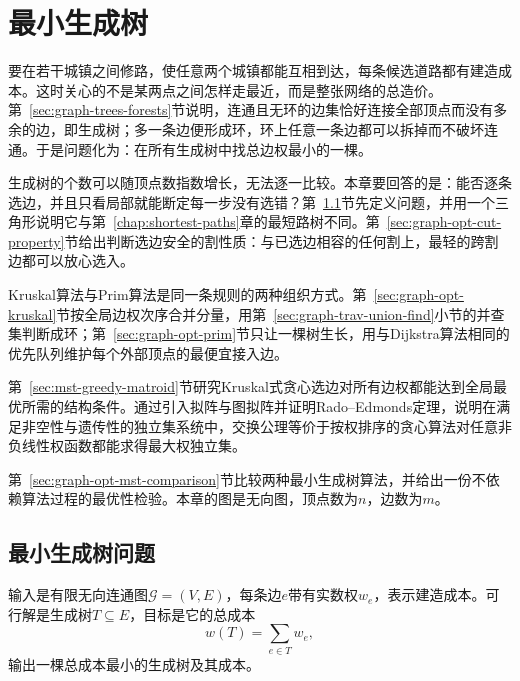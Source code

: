 
\chapter{最小生成树}
\label{sec:graph-minimum-spanning-tree}
\label{chap:minimum-spanning-tree}

要在若干城镇之间修路，使任意两个城镇都能互相到达，每条候选道路都有建造成本。这时关心的不是某两点之间怎样走最近，而是整张网络的总造价。第~\ref{sec:graph-trees-forests}节说明，连通且无环的边集恰好连接全部顶点而没有多余的边，即生成树；多一条边便形成环，环上任意一条边都可以拆掉而不破坏连通。于是问题化为：在所有生成树中找总边权最小的一棵。

生成树的个数可以随顶点数指数增长，无法逐一比较。本章要回答的是：能否逐条选边，并且只看局部就能断定每一步没有选错？第~\ref{sec:graph-opt-mst-problem}节先定义问题，并用一个三角形说明它与第~\ref{chap:shortest-paths}章的最短路树不同。第~\ref{sec:graph-opt-cut-property}节给出判断选边安全的割性质：与已选边相容的任何割上，最轻的跨割边都可以放心选入。

Kruskal算法与Prim算法是同一条规则的两种组织方式。第~\ref{sec:graph-opt-kruskal}节按全局边权次序合并分量，用第~\ref{sec:graph-trav-union-find}小节的并查集判断成环；第~\ref{sec:graph-opt-prim}节只让一棵树生长，用与Dijkstra算法相同的优先队列维护每个外部顶点的最便宜接入边。

第~\ref{sec:mst-greedy-matroid}节研究Kruskal式贪心选边对所有边权都能达到全局最优所需的结构条件。通过引入拟阵与图拟阵并证明Rado--Edmonds定理，说明在满足非空性与遗传性的独立集系统中，交换公理等价于按权排序的贪心算法对任意非负线性权函数都能求得最大权独立集。

第~\ref{sec:graph-opt-mst-comparison}节比较两种最小生成树算法，并给出一份不依赖算法过程的最优性检验。本章的图是无向图，顶点数为$n$，边数为$m$。

\section{最小生成树问题}
\label{sec:graph-opt-mst-problem}

输入是有限无向连通图$\mathcal G=(V,E)$，每条边$e$带有实数权$w_e$，表示建造成本。可行解是生成树$T\subseteq E$，目标是它的总成本
\begin{equation}
  w(T)=\sum_{e\in T}w_e,
  \label{eq:graph-opt-mst-cost}
\end{equation}
输出一棵总成本最小的生成树及其成本。


